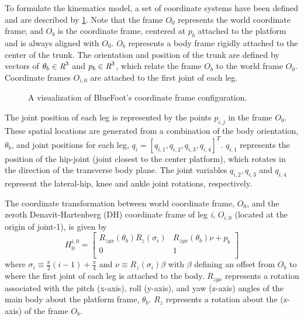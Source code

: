 			To formulate the kinematics model, a set of coordinate systems have been defined and are described by \ref{fig::coordinate_frames}. Note that the frame $O_{0}$ represents the world coordinate frame; and $O_{b}$ is the coordinate frame, centered at  ${p}_{b}$ attached to the platform and is always aligned with $O_{0}$. $O_{b}$ represents a body frame rigidly attached to the center of the trunk. The orientation and position of the trunk are defined by vectors of $\theta_{b}\in\emph{R}^{3}$ and ${p}_{b}\in\emph{R}^{3}$, which relate the frame $O_{b}$ to the world frame $O_{0}$. Coordinate frames $O_{i,0}$ are attached to the first joint of each \Ith leg.
%
				\begin{figure}[h!]
					\centering
					\caption{A visualization of BlueFoot's coordinate frame configuration.}
					\label{fig::coordinate_frames}
				\end{figure}
%
			The \Jth joint position of each \Ith leg is represented  by the points ${p}_{i,j}$ in the frame $O_{0}$. These spatial locations are generated from a combination of the body orientation, $\theta_{b}$, and joint positions for each \Ith leg, $q_{i} = [q_{i,1}, q_{i,2}, q_{i,3}, q_{i,4}]^T$. $q_{i,1}$ represents the position of the hip-joint (joint closest to the center platform), which rotates in the direction of the transverse body plane. The joint variables $q_{i,2}, q_{i,3}$ and $q_{i,4}$ represent the lateral-hip, knee and ankle joint rotations, respectively.

			The coordinate transformation between world coordinate frame, $O_{0}$, and the zeroth Denavit-Hartenberg (DH) coordinate frame of leg \emph{i}, $O_{i,0}$ (located at the origin of joint-1), is given by
				\begin{equation}
					H_{0}^{i,0} = \left[ 
					\begin{array}{c|c}
						R_{zyx}(\theta_{b}) R_{z}(\sigma_{i})	&R_{zyx}(\theta_{b}) \nu + {p}_{b} 	\\ \hline
						0										&	1											\\
					\end{array} 
					\right]
					\label{eq::world_to_dh}
				\end{equation}
			where $\sigma_{i} \equiv \frac{\pi}{2}(i-1) + \frac{\pi}{4} $ and $\nu \equiv  R_{z}(\sigma_{i}) \beta$ with $\beta$ defining an offset from $O_{b}$ to where the first joint of each leg is attached to the body. $R_{zyx}$ represents a rotation associated with the pitch (x-axis), roll (y-axis), and yaw (z-axis) angles of the main body about the platform frame, $\theta_{b}$. $R_{z}$ represents a rotation about the (z-axis) of the frame $O_{b}$. 

